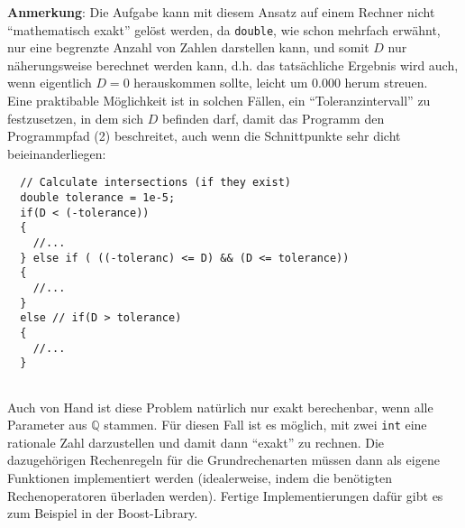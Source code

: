 \documentclass[paper=A4, pagesize, DIV=calc, smallheadings,
fontsize=11pt, expansion=false]{scrreprt}
\begin{document}
\textbf{Anmerkung}: Die Aufgabe kann mit diesem Ansatz auf einem Rechner nicht ``mathematisch exakt'' gelöst werden, 
da \texttt{double}, wie schon mehrfach erwähnt, nur eine begrenzte Anzahl von Zahlen darstellen kann, 
und somit $D$ nur näherungsweise berechnet werden kann,
d.h. das tatsächliche Ergebnis wird auch, wenn eigentlich $D=0$ herauskommen sollte, leicht um 0.000 herum streuen. 
\\
Eine praktibable Möglichkeit ist in solchen Fällen, ein ``Toleranzintervall'' zu festzusetzen, in dem sich $D$ befinden darf, 
damit das Programm den Programmpfad (2) beschreitet, auch wenn die Schnittpunkte sehr dicht beieinanderliegen:
\begin{verbatim}
  // Calculate intersections (if they exist)
  double tolerance = 1e-5;
  if(D < (-tolerance))
  {
    //...
  } else if ( ((-toleranc) <= D) && (D <= tolerance))
  {
    //...  
  }
  else // if(D > tolerance)
  {  
    //...
  }


\end{verbatim}
Auch von Hand ist diese Problem natürlich nur exakt berechenbar, wenn alle Parameter aus $\mathbb{Q}$ stammen.
Für diesen Fall ist es möglich, mit zwei \texttt{int} eine rationale Zahl darzustellen und damit dann ``exakt'' zu rechnen.
Die dazugehörigen Rechenregeln für die Grundrechenarten müssen dann als eigene Funktionen implementiert werden (idealerweise, indem die benötigten Rechenoperatoren überladen werden).
Fertige Implementierungen dafür gibt es zum Beispiel in der Boost-Library.
\end{document}
